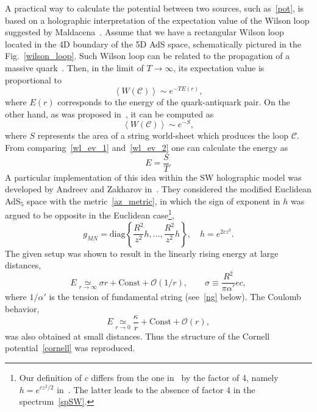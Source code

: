 \documentclass[a4paper,11pt]{article}
\begin{document}
A practical way to calculate the potential between two sources, such as~\eqref{pot}, is based on
a holographic interpretation of the expectation value of the Wilson loop suggested by
Maldacena~\cite{Maldacena:1998im}. Assume that we have a rectangular Wilson loop located in the
4D boundary of the 5D AdS space, schematically pictured in the Fig.~\ref{wilson_loop}.
Such Wilson loop can be related to the propagation of a massive quark~\cite{Maldacena:1998im}.
Then, in the limit of \(T\to\infty\), its expectation value is proportional to~\cite{Maldacena:1998im}
\begin{equation}
\label{wl_ev_1}
  \left\langle W(\mathcal{C})\right\rangle\sim e^{-TE(r)},
\end{equation}
where \(E(r)\) corresponds to the energy of the quark-antiquark pair. On the other hand,
as was proposed in~\cite{Maldacena:1998im}, it can be computed as
\begin{equation}
\label{wl_ev_2}
  \left\langle W(\mathcal{C})\right\rangle\sim e^{-S},
\end{equation}
where \(S\) represents the area of a string world-sheet which produces the loop
\(\mathcal{C}\). From comparing~\eqref{wl_ev_1} and~\eqref{wl_ev_2} one can calculate the
energy as
\begin{equation}
\label{en_def}
  E=\frac{S}{T}.
\end{equation}
A particular implementation of this idea within the SW holographic model was developed by
Andreev and Zakharov in~\cite{Andreev:2006ct}. They considered the modified Euclidean AdS\(_5\) space
with the metric~\eqref{az_metric}, in which the sign of exponent in $h$ was argued to be opposite in the
Euclidean case\footnote{Our definition of $c$ differs from the one in~\cite{Andreev:2006ct} by the factor of 4,
namely $h=e^{cz^2/2}$ in~\cite{Andreev:2006ct}. The latter leads to the absence of factor 4 in the spectrum~\eqref{spSW}.},
\begin{equation}
\label{az_metric2}
  g_{MN}=\text{diag}\left\lbrace\frac{R^2}{z^2}h,\dots,\frac{R^2}{z^2}h\right\rbrace,\quad
  h=e^{2cz^2}.
\end{equation}
The given setup was shown to result in the linearly rising energy at large distances,
\begin{equation}
\label{az_large_r_en}
  E\underset{r\to\infty}{\simeq}\sigma r + \text{Const} + \mathcal{O}(1/r),\qquad
  \sigma\equiv\frac{R^2}{\pi\alpha'}ec,
\end{equation}
where $1/\alpha'$ is the tension of fundamental string (see~\eqref{ng} below). The Coulomb behavior,
\begin{equation}
  E\underset{r\to0}{\simeq}\frac{\kappa}{r} + \text{Const} + \mathcal{O}(r),
\end{equation}
was also obtained at small distances. Thus the structure of the Cornell potential~\eqref{cornell}
was reproduced.
\end{document}
